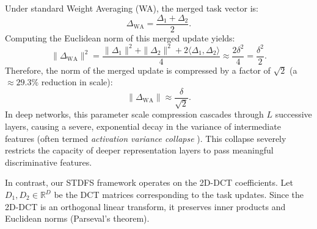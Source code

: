 \documentclass{article}
\theoremstyle{plain}
\theoremstyle{definition}
\theoremstyle{remark}
\begin{document}
Under standard Weight Averaging (WA), the merged task vector is:
\begin{equation}
    \Delta_{\text{WA}} = \frac{\Delta_1 + \Delta_2}{2}.
\end{equation}
Computing the Euclidean norm of this merged update yields:
\begin{equation}
    \|\Delta_{\text{WA}}\|^2 = \frac{\|\Delta_1\|^2 + \|\Delta_2\|^2 + 2\langle \Delta_1, \Delta_2 \rangle}{4} \approx \frac{2\delta^2}{4} = \frac{\delta^2}{2}.
\end{equation}
Therefore, the norm of the merged update is compressed by a factor of $\sqrt{2}$ (a $\approx 29.3\%$ reduction in scale):
\begin{equation}
    \|\Delta_{\text{WA}}\| \approx \frac{\delta}{\sqrt{2}}.
\end{equation}
In deep networks, this parameter scale compression cascades through $L$ successive layers, causing a severe, exponential decay in the variance of intermediate features (often termed \textit{activation variance collapse} \cite{jordan2022repair}). This collapse severely restricts the capacity of deeper representation layers to pass meaningful discriminative features.

In contrast, our STDFS framework operates on the 2D-DCT coefficients. Let $D_1, D_2 \in \mathbb{R}^D$ be the DCT matrices corresponding to the task updates. Since the 2D-DCT is an orthogonal linear transform, it preserves inner products and Euclidean norms (Parseval's theorem).
\end{document}
